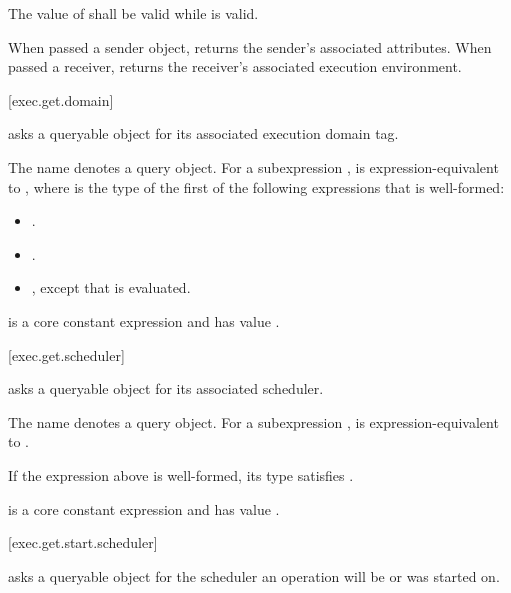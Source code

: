 \pnum
The value of  shall be valid while  is valid.

\pnum
\begin{note}
When passed a sender object,
 returns the sender's associated attributes.
When passed a receiver,
 returns the receiver's associated execution environment.
\end{note}

[exec.get.domain]{}

\pnum
{} asks a queryable object
for its associated execution domain tag.

\pnum
The name  denotes a query object.
For a subexpression ,
 is expression-equivalent to
,
where  is the type of the first
of the following expressions that is well-formed:
\begin{itemize}
\item {}.
\item {}.
\item {}, except that  is evaluated.
\end{itemize}

\pnum
{} is
a core constant expression and has value .

[exec.get.scheduler]{}

\pnum
{} asks a queryable object for its associated scheduler.

\pnum
The name  denotes a query object.
For a subexpression ,
 is expression-equivalent to
.

\mandates
If the expression above is well-formed,
its type satisfies .

\pnum
{} is
a core constant expression and has value .

[exec.get.start.scheduler]{}

\pnum
{} asks a queryable object
for the scheduler an operation will be or was started on.

